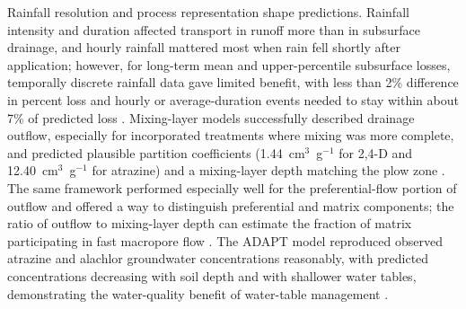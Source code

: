 Rainfall resolution and process representation shape predictions. Rainfall intensity and duration affected transport in runoff more than in subsurface drainage, and hourly rainfall mattered most when rain fell shortly after application; however, for long-term mean and upper-percentile subsurface losses, temporally discrete rainfall data gave limited benefit, with less than 2\% difference in percent loss and hourly or average-duration events needed to stay within about 7\% of predicted loss \parencite{Fox2007}. Mixing-layer models successfully described drainage outflow, especially for incorporated treatments where mixing was more complete, and predicted plausible partition coefficients (1.44~cm$^3$~g$^{-1}$ for 2,4-D and 12.40~cm$^3$~g$^{-1}$ for atrazine) and a mixing-layer depth matching the plow zone \parencite{Shalit1996}. The same framework performed especially well for the preferential-flow portion of outflow and offered a way to distinguish preferential and matrix components; the ratio of outflow to mixing-layer depth can estimate the fraction of matrix participating in fast macropore flow \parencite{SHALIT1995,Shalit1996}. The ADAPT model reproduced observed atrazine and alachlor groundwater concentrations reasonably, with predicted concentrations decreasing with soil depth and with shallower water tables, demonstrating the water-quality benefit of water-table management \parencite{Kalita1998}.

